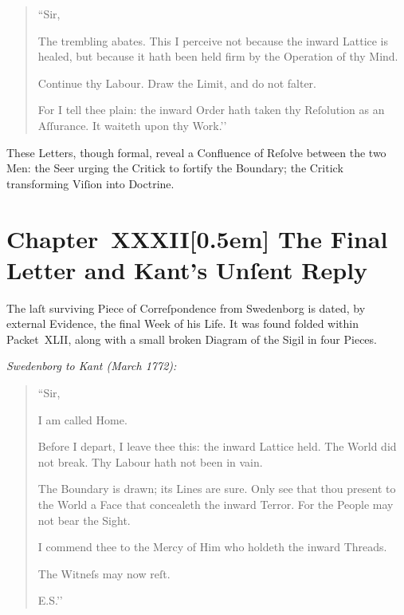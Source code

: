 \documentclass[12pt]{book}
\begin{document}
\begin{quote}
``Sir,

The trembling abates. This I perceive not because the inward Lattice is healed, but because it hath been held firm by the Operation of thy Mind.

Continue thy Labour. Draw the Limit, and do not falter.

For I tell thee plain: the inward Order hath taken thy Reſolution as an Aſſurance. It waiteth upon thy Work.’’
\end{quote}

\medskip

These Letters, though formal, reveal a Confluence of Reſolve between the two Men: the Seer urging the Critick to fortify the Boundary; the Critick transforming Viſion into Doctrine.


\chapter*{Chapter~XXXII[0.5em]
The Final Letter and Kant’s Unſent Reply}


The laſt surviving Piece of Correſpondence from Swedenborg is dated, by external Evidence, the final Week of his Life. It was found folded within Packet~XLII, along with a small broken Diagram of the Sigil in four Pieces.

\medskip

\noindent\textit{Swedenborg to Kant (March 1772):}

\begin{quote}
``Sir,

I am called Home.

Before I depart, I leave thee this: the inward Lattice held. The World did not break. Thy Labour hath not been in vain.

The Boundary is drawn; its Lines are sure. Only see that thou present to the World a Face that concealeth the inward Terror. For the People may not bear the Sight.

I commend thee to the Mercy of Him who holdeth the inward Threads.

The Witneſs may now reſt.

\hfill E.S.’’
\end{quote}
\end{document}
